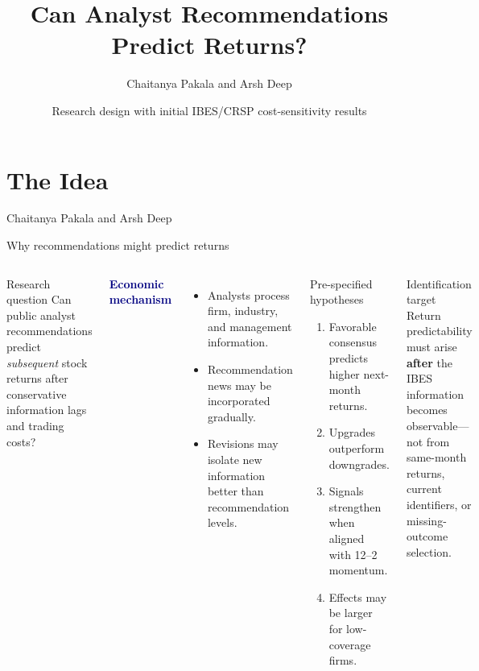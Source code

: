 \documentclass[aspectratio=169,10pt]{beamer}
\title{Can Analyst Recommendations Predict Returns?}
\subtitle{}
\author{Chaitanya Pakala and Arsh Deep}
\date{Research design with initial IBES/CRSP cost-sensitivity results}
\newcommand{\smallhead}[1]{\textcolor{navy}{\textbf{#1}}}
\begin{document}
\section{The Idea}
{
\begin{frame}
  \vspace{1.05cm}
  \begin{center}
  \end{center}
  \vspace{0.75cm}
  \begin{center}
    {\Large Chaitanya Pakala and Arsh Deep}
  \end{center}
\end{frame}}

\begin{frame}[shrink=10]{Why recommendations might predict returns}
\begin{columns}[T,onlytextwidth]
\begin{block}{Research question}
Can public analyst recommendations predict \emph{subsequent} stock returns after conservative information lags and trading costs?
\end{block}
\smallhead{Economic mechanism}
\begin{itemize}\setlength\itemsep{0.35em}
  \item Analysts process firm, industry, and management information.
  \item Recommendation news may be incorporated gradually.
  \item Revisions may isolate new information better than recommendation levels.
\end{itemize}
\begin{block}{Pre-specified hypotheses}
\begin{enumerate}\setlength\itemsep{0.35em}
  \item Favorable consensus predicts higher next-month returns.
  \item Upgrades outperform downgrades.
  \item Signals strengthen when aligned with 12--2 momentum.
  \item Effects may be larger for low-coverage firms.
\end{enumerate}
\end{block}
\begin{alertblock}{Identification target}
Return predictability must arise \textbf{after} the IBES information becomes observable---not from same-month returns, current identifiers, or missing-outcome selection.
\end{alertblock}
\end{columns}
\end{frame}
\end{document}
